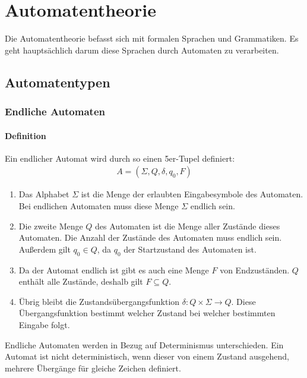 \chapter{Automatentheorie}
\begin{flushleft}
    Die Automatentheorie befasst sich mit formalen Sprachen und Grammatiken.
    Es geht hauptsächlich darum diese Sprachen durch Automaten zu verarbeiten.
\end{flushleft}

\section{Automatentypen}
\subsection{Endliche Automaten}
\subsubsection{Definition}
\begin{flushleft}
    Ein endlicher Automat wird durch so einen 5er-Tupel definiert:
    \begin{align}
        A=(\Sigma,Q,\delta,q_0,F)
    \end{align}
    \begin{enumerate}
        \item {
            Das Alphabet $\Sigma$ ist die Menge der erlaubten Eingabesymbole des Automaten.
            Bei endlichen Automaten muss diese Menge $\Sigma$ endlich sein.
        }
        \item {
            Die zweite Menge $Q$ des Automaten ist die Menge aller Zustände dieses Automaten.
            Die Anzahl der Zustände des Automaten muss endlich sein.
            Außerdem gilt $q_0 \in Q$, da $q_0$ der Startzustand des Automaten ist.
        }
        \item {
            Da der Automat endlich ist gibt es auch eine Menge $F$ von Endzuständen.
            $Q$ enthält alle Zustände, deshalb gilt $F \subseteq Q$.
        }
        \item {
            Übrig bleibt die Zustandsübergangsfunktion $\delta: Q \times \Sigma \rightarrow Q$.
            Diese Übergangsfunktion bestimmt welcher Zustand bei welcher bestimmten Eingabe folgt.
        }
    \end{enumerate}
    Endliche Automaten werden in Bezug auf Determinismus unterschieden.
    Ein Automat ist nicht deterministisch, wenn dieser von einem Zustand ausgehend, mehrere Übergänge
    für gleiche Zeichen definiert.
\end{flushleft}

